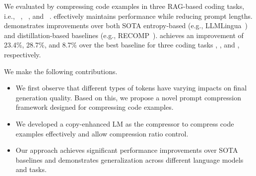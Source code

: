 We evaluated \ourtool by compressing code examples in three RAG-based coding tasks, i.e., \taskone~\cite{UBC}, \tasktwo~\cite{codexglue}, and \taskthree~\cite{allyouneed}. \ourtool effectively maintains performance while reducing prompt lengths. \ourtool demonstrates improvements over both SOTA entropy-based (e.g., LLMLingua~\citep{llmlingua}) and distillation-based baselines (e.g., RECOMP~\citep{recomp}). \ourtool achieves an improvement of 23.4\%, 28.7\%, and 8.7\% over the best baseline for three coding tasks \taskone, \tasktwo, and \taskthree, respectively.



We make the following contributions.
\vspace{-0.1in}
\begin{itemize}
    \setlength\itemsep{-0.07in} %
    \item We first observe that different types of tokens have varying impacts on final generation quality. Based on this, we propose a novel prompt compression framework designed for compressing code examples.
    \item We developed a copy-enhanced LM as the compressor to compress code examples effectively and allow compression ratio control.
    \item Our approach achieves significant performance improvements over SOTA baselines and demonstrates generalization across different language models and tasks.
\end{itemize}







